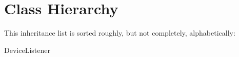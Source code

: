 \section{Class Hierarchy}
This inheritance list is sorted roughly, but not completely, alphabetically\+:\begin{DoxyCompactList}
\item {}
\item Device\+Listener\begin{DoxyCompactList}
\item {}
\end{DoxyCompactList}
\item {}
\item {}
\end{DoxyCompactList}
